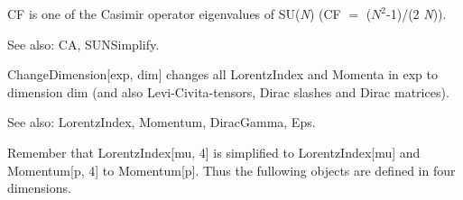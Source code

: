 






CF is one of the Casimir operator eigenvalues of SU({\itshape N}) (CF \(=\) (\({N^2}\)-1)/(2 {\itshape N})).

See also:  CA, SUNSimplify.














ChangeDimension[exp, dim] changes all LorentzIndex and Momenta in exp to dimension dim (and also Levi-Civita-tensors, Dirac slashes and
  Dirac matrices).

See also:  LorentzIndex, Momentum, DiracGamma, Eps.


Remember that LorentzIndex[mu, 4] is simplified to LorentzIndex[mu] and Momentum[p, 4] to Momentum[p]. Thus the fullowing objects are
  defined in four dimensions.

